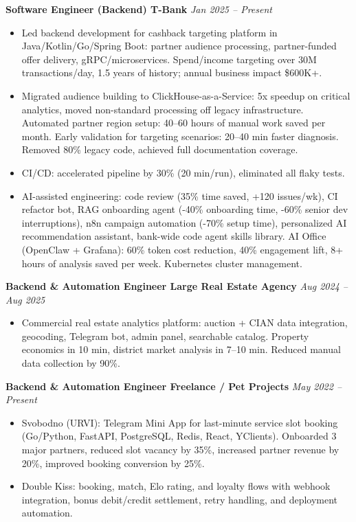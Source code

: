 \documentclass[10pt,a4paper]{article}
\begin{document}
\textbf{Software Engineer (Backend) \textbar{} T-Bank} \hfill \textit{Jan 2025 -- Present}
\begin{itemize}
  \item Led backend development for cashback targeting platform in Java/Kotlin/Go/Spring Boot: partner audience processing, partner-funded offer delivery, gRPC/microservices. Spend/income targeting over 30M transactions/day, 1.5 years of history; annual business impact \$600K+.
  \item Migrated audience building to ClickHouse-as-a-Service: 5x speedup on critical analytics, moved non-standard processing off legacy infrastructure. Automated partner region setup: 40--60 hours of manual work saved per month. Early validation for targeting scenarios: 20--40 min faster diagnosis. Removed 80\% legacy code, achieved full documentation coverage.
  \item CI/CD: accelerated pipeline by 30\% (20 min/run), eliminated all flaky tests.
  \item AI-assisted engineering: code review (35\% time saved, +120 issues/wk), CI refactor bot, RAG onboarding agent (-40\% onboarding time, -60\% senior dev interruptions), n8n campaign automation (-70\% setup time), personalized AI recommendation assistant, bank-wide code agent skills library. AI Office (OpenClaw + Grafana): 60\% token cost reduction, 40\% engagement lift, 8+ hours of analysis saved per week. Kubernetes cluster management.
\end{itemize}

\textbf{Backend \& Automation Engineer \textbar{} Large Real Estate Agency} \hfill \textit{Aug 2024 -- Aug 2025}
\begin{itemize}
  \item Commercial real estate analytics platform: auction + CIAN data integration, geocoding, Telegram bot, admin panel, searchable catalog. Property economics in 10 min, district market analysis in 7--10 min. Reduced manual data collection by 90\%.
\end{itemize}

\textbf{Backend \& Automation Engineer \textbar{} Freelance / Pet Projects} \hfill \textit{May 2022 -- Present}
\begin{itemize}
  \item Svobodno (URVI): Telegram Mini App for last-minute service slot booking (Go/Python, FastAPI, PostgreSQL, Redis, React, YClients). Onboarded 3 major partners, reduced slot vacancy by 35\%, increased partner revenue by 20\%, improved booking conversion by 25\%.
  \item Double Kiss: booking, match, Elo rating, and loyalty flows with webhook integration, bonus debit/credit settlement, retry handling, and deployment automation.
\end{itemize}
\end{document}
